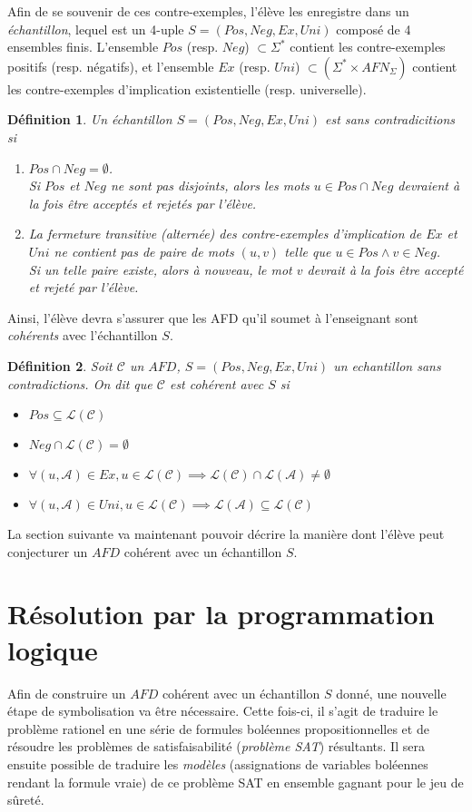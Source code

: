 \documentclass[12pt,a4paper,oneside,titlepage]{report}
\newtheorem{defi}{D\'efinition}[section]
\begin{document}
Afin de se souvenir de ces contre-exemples, l'élève les enregistre dans un \emph{échantillon}, lequel est un 4-uple $S=(Pos, Neg, Ex, Uni)$ composé de 4 ensembles finis. L'ensemble $Pos$ (resp. $Neg$) $\subset\Sigma^*$ contient les contre-exemples positifs (resp. négatifs), et l'ensemble $Ex$ (resp. $Uni$) $\subset(\Sigma^*\times AFN_\Sigma)$ contient les contre-exemples d'implication existentielle (resp. universelle).
\begin{defi}
Un échantillon $S=(Pos, Neg, Ex, Uni)$ est \emph{sans contradicitions} si \begin{enumerate}
\item $Pos\cap Neg=\emptyset$.\\ 
Si $Pos$ et $Neg$ ne sont pas disjoints, alors les mots $u\in Pos\cap Neg$ devraient à la fois être acceptés et rejetés par l'élève.
\item La fermeture transitive (alternée) des contre-exemples d'implication de $Ex$ et $Uni$ ne contient pas de paire de mots $(u,v)$ telle que $u\in Pos \land v\in Neg$.\\
Si un telle paire existe, alors à nouveau, le mot $v$ devrait à la fois être accepté et rejeté par l'élève.

\end{enumerate}
\end{defi}
\noindent Ainsi, l'élève devra s'assurer que les AFD qu'il soumet à l'enseignant sont \emph{cohérents} avec l'échantillon $S$.
\begin{defi}
Soit $\mathcal{C}$ un $AFD$, $S=(Pos, Neg, Ex, Uni)$ un echantillon sans contradictions. On dit que $\mathcal{C}$ est \emph{cohérent} avec $S$ si
\begin{itemize}
\item $Pos\subseteq \mathcal{L}(\mathcal{C})$
\item $Neg\cap \mathcal{L}(\mathcal{C})=\emptyset$
\item $\forall (u,\mathcal{A})\in Ex, u\in\mathcal{L}(\mathcal{C})\implies  \mathcal{L}(\mathcal{C})\cap \mathcal{L}(\mathcal{A})\neq\emptyset$
\item $\forall (u,\mathcal{A})\in Uni, u\in\mathcal{L}(\mathcal{C})\implies  \mathcal{L}(\mathcal{A})\subseteq \mathcal{L}(\mathcal{C})$
\end{itemize}
\end{defi}
\noindent La section suivante va maintenant pouvoir décrire la manière dont l'élève peut conjecturer un $AFD$ cohérent avec un échantillon $S$.
\section{Résolution par la programmation logique}
Afin de construire un $AFD$ cohérent avec un échantillon $S$ donné, une nouvelle étape de symbolisation va être nécessaire. Cette fois-ci, il s'agit de traduire le problème rationel en une série de formules boléennes propositionnelles et de résoudre les problèmes de satisfaisabilité (\emph{problème SAT}) résultants. Il sera ensuite possible de traduire les \emph{modèles} (assignations de variables boléennes rendant la formule vraie) de ce problème SAT en ensemble gagnant pour le jeu de sûreté.\\
\end{document}
